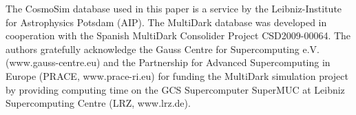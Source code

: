 \documentclass[english,usenatbib]{mn2e}
\begin{document}
The CosmoSim database used in this paper is a service by the Leibniz-Institute for Astrophysics Potsdam (AIP). The MultiDark database was developed in cooperation with the Spanish MultiDark Consolider Project CSD2009-00064. The authors gratefully acknowledge the Gauss Centre for Supercomputing e.V. (www.gauss-centre.eu) and the Partnership for Advanced Supercomputing in Europe (PRACE, www.prace-ri.eu) for funding the MultiDark simulation project by providing computing time on the GCS Supercomputer SuperMUC at Leibniz Supercomputing Centre (LRZ, www.lrz.de).


\end{document}
